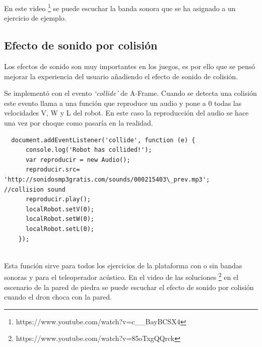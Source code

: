 En este video \footnote{https://www.youtube.com/watch?v=c\_\_BayBCSX4} se puede escuchar la banda sonora que se ha asignado a un ejercicio de ejemplo.

\subsection{Efecto de sonido por colisión }

Los efectos de sonido son muy importantes en los juegos, es por ello que se pensó mejorar la experiencia del usuario añadiendo el efecto de sonido de colisión. 

Se implementó con el evento \textit{`collide'} de A-Frame. Cuando se detecta una colisión este evento llama a una función que reproduce un audio y pone a 0 todas las velocidades V, W y L del robot.  En este caso la reproducción del audio se hace una vez por choque como pasaría en la realidad.

\begin{lstlisting}
  document.addEventListener('collide', function (e) {
      console.log('Robot has collided!');
      var reproducir = new Audio();
      reproducir.src= 'http://sonidosmp3gratis.com/sounds/000215403\_prev.mp3';   //collision sound
      reproducir.play();
      localRobot.setV(0);
      localRobot.setW(0);
      localRobot.setL(0);
	});
	
\end{lstlisting}

Esta función sirve para todos los ejercicios de la plataforma con o sin  bandas sonoras y para el teleoperador acústico. En el video de las soluciones  \footnote{https://www.youtube.com/watch?v=85oTxgQQrck}  en el escenario de la pared de piedra se puede escuchar el efecto de sonido por colisión cuando el dron choca con la pared.